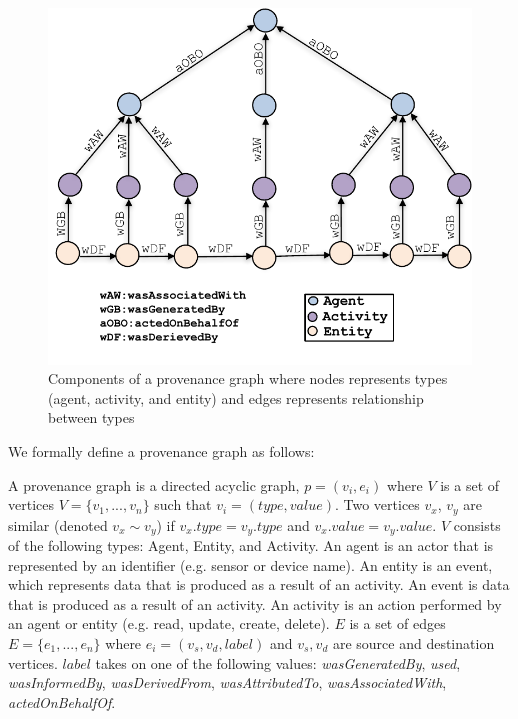 \begin{figure}[h!]
\begin{center}
\includegraphics[width=\columnwidth]{picture13.pdf}
\end{center}
\caption{Components of a provenance graph where nodes represents types (agent, activity, and entity) and edges represents relationship between types}
\label{Provenance_Sensor}
\end{figure}


We formally define a provenance graph as follows:

\begin{definition}

A provenance graph is a directed acyclic graph, $p = (v_i, e_i)$ where $V$ is a set of vertices $V =\{v_1,...,v_n\}$ such that $v_i = (type, value)$. Two vertices $v_x$, $v_y$ are similar (denoted $ v_x \sim v_y$) if $v_x.type = v_y.type$ and $v_x.value = v_y. value$. $V$ consists of the following types: Agent, Entity, and Activity.  An agent is an actor that is represented by an identifier (e.g. sensor or device name). An entity is an event, which represents data that is produced as a result of an activity. An event is data that is produced as a result of an activity. An activity is an action performed by an agent or entity (e.g. read, update, create, delete). $E$ is a set of edges $E =\{e_1,..., e_n\}$ where $e_i = (v_s, v_d, label)$ and $v_s, v_d$ are source and destination vertices. $label$ takes on one of the following values: \textit{wasGeneratedBy}, \textit{used}, \textit{wasInformedBy}, \textit{wasDerivedFrom}, \textit{wasAttributedTo}, \textit{wasAssociatedWith}, \textit{actedOnBehalfOf}. 




\end{definition}


